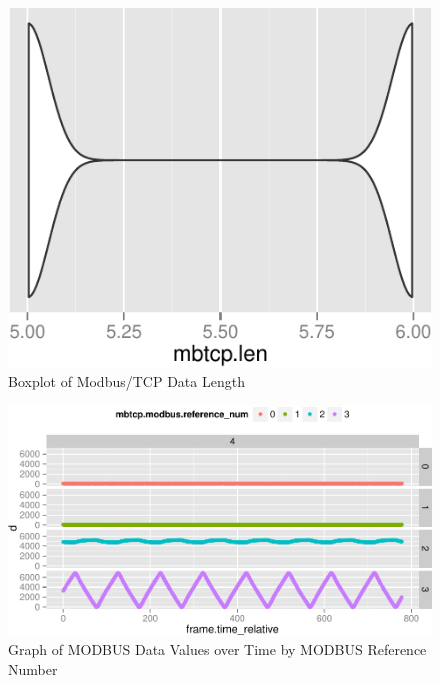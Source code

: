 \documentclass[11pt,a4paper]{article}
\begin{document}
\begin{figure}[h]

{\centering \includegraphics{thesis_files/figure-latex/unnamed-chunk-27-1} 

}

\caption{Boxplot of Modbus/TCP Data Length}\label{fig:unnamed-chunk-27}
\end{figure}

\begin{figure}[h]

{\centering \includegraphics{thesis_files/figure-latex/unnamed-chunk-28-1} 

}

\caption{Graph of MODBUS Data Values over Time by MODBUS  Reference Number}\label{fig:unnamed-chunk-28}
\end{figure}
\end{document}
